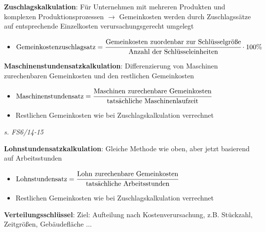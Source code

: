 \textbf{Zuschlagskalkulation}: Für Unternehmen mit mehreren Produkten und komplexen Produktionsprozessen $\rightarrow$ Gemeinkosten werden durch Zuschlagssätze auf entsprechende Einzelkosten verursachungsgerecht umgelegt
\begin{itemize}
	\item $\text{Gemeinkostenzuschlagsatz}=\cfrac{\text{Gemeinkosten zuordenbar zur Schlüsselgröße}}{\text{Anzahl der Schlüsseleinheiten}}\cdot 100\%$
\end{itemize}
\bigskip
\textbf{Maschinenstundensatzkalkulation}: Differenzierung von Maschinen zurechenbaren Gemeinkosten und den restlichen Gemeinkosten
\begin{itemize}
	\item $\text{Maschinenstundensatz}=\cfrac{\text{Maschinen zurechenbare Gemeinkosten}}{\text{tatsächliche Maschinenlaufzeit}}$
	\item Restlichen Gemeinkosten wie bei Zuschlagskalkulation verrechnet
\end{itemize}
\textit{s. FS6/14-15}

\pagebreak
\textbf{Lohnstundensatzkalkulation}: Gleiche Methode wie oben, aber jetzt basierend auf Arbeitsstunden
\begin{itemize}
	\item $\text{Lohnstundensatz}=\cfrac{\text{Lohn zurechenbare Gemeinkosten}}{\text{tatsächliche Arbeitsstunden}}$
	\item Restlichen Gemeinkosten wie bei Zuschlagskalkulation verrechnet
\end{itemize}
\bigskip
\textbf{Verteilungsschlüssel}: Ziel: Aufteilung nach Kostenverursachung, z.B. Stückzahl, Zeitgrößen, Gebäudefläche $\ldots$ 
